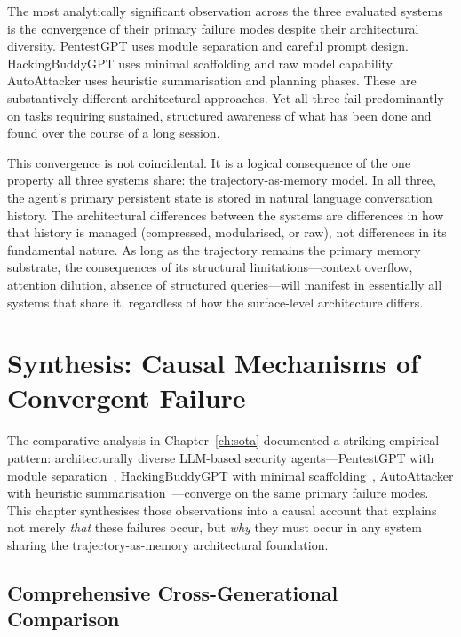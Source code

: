 \documentclass[12pt,a4paper,oneside,openany]{book}
\begin{document}
The most analytically significant observation across the three evaluated systems is the convergence of their primary failure modes despite their architectural diversity. PentestGPT uses module separation and careful prompt design. HackingBuddyGPT uses minimal scaffolding and raw model capability. AutoAttacker uses heuristic summarisation and planning phases. These are substantively different architectural approaches. Yet all three fail predominantly on tasks requiring sustained, structured awareness of what has been done and found over the course of a long session.

This convergence is not coincidental. It is a logical consequence of the one property all three systems share: the trajectory-as-memory model. In all three, the agent's primary persistent state is stored in natural language conversation history. The architectural differences between the systems are differences in how that history is managed (compressed, modularised, or raw), not differences in its fundamental nature. As long as the trajectory remains the primary memory substrate, the consequences of its structural limitations---context overflow, attention dilution, absence of structured queries---will manifest in essentially all systems that share it, regardless of how the surface-level architecture differs.

\chapter{Synthesis: Causal Mechanisms of Convergent Failure}
\label{ch:synthesis}

The comparative analysis in Chapter~\ref{ch:sota} documented a striking empirical pattern: architecturally diverse LLM-based security agents---PentestGPT with module separation~\citep{deng2024pentestgpt}, HackingBuddyGPT with minimal scaffolding~\citep{happe2023hackerllm}, AutoAttacker with heuristic summarisation~\citep{xu2024autoattacker}---converge on the same primary failure modes. This chapter synthesises those observations into a causal account that explains not merely \textit{that} these failures occur, but \textit{why} they must occur in any system sharing the trajectory-as-memory architectural foundation.

\section{Comprehensive Cross-Generational Comparison}
\end{document}
